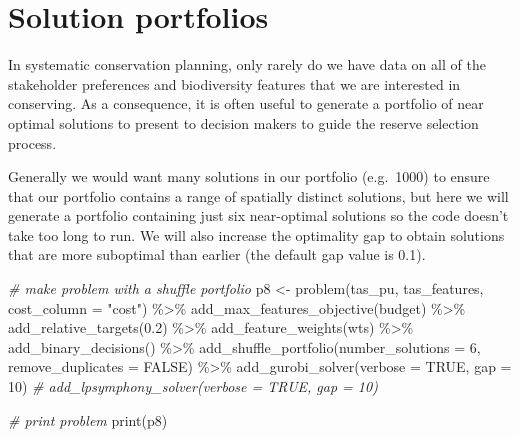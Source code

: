 \documentclass[
  12pt,
]{book}
\newenvironment{Shaded}{\begin{snugshade}}{\end{snugshade}}
\newcommand{\AttributeTok}[1]{\textcolor[rgb]{0.77,0.63,0.00}{#1}}
\newcommand{\CommentTok}[1]{\textcolor[rgb]{0.56,0.35,0.01}{\textit{#1}}}
\newcommand{\ConstantTok}[1]{\textcolor[rgb]{0.00,0.00,0.00}{#1}}
\newcommand{\DecValTok}[1]{\textcolor[rgb]{0.00,0.00,0.81}{#1}}
\newcommand{\FloatTok}[1]{\textcolor[rgb]{0.00,0.00,0.81}{#1}}
\newcommand{\FunctionTok}[1]{\textcolor[rgb]{0.00,0.00,0.00}{#1}}
\newcommand{\NormalTok}[1]{#1}
\newcommand{\OtherTok}[1]{\textcolor[rgb]{0.56,0.35,0.01}{#1}}
\newcommand{\SpecialCharTok}[1]{\textcolor[rgb]{0.00,0.00,0.00}{#1}}
\newcommand{\StringTok}[1]{\textcolor[rgb]{0.31,0.60,0.02}{#1}}
\begin{document}
\hypertarget{solution-portfolios}{%
\section{Solution portfolios}\label{solution-portfolios}}

In systematic conservation planning, only rarely do we have data on all of the stakeholder preferences and biodiversity features that we are interested in conserving. As a consequence, it is often useful to generate a portfolio of near optimal solutions to present to decision makers to guide the reserve selection process.

Generally we would want many solutions in our portfolio (e.g.~1000) to ensure that our portfolio contains a range of spatially distinct solutions, but here we will generate a portfolio containing just six near-optimal solutions so the code doesn't take too long to run. We will also increase the optimality gap to obtain solutions that are more suboptimal than earlier (the default gap value is 0.1).

\begin{Shaded}
\begin{Highlighting}[]
\CommentTok{\# make problem with a shuffle portfolio}
\NormalTok{p8 }\OtherTok{\textless{}{-}} \FunctionTok{problem}\NormalTok{(tas\_pu, tas\_features, }\AttributeTok{cost\_column =} \StringTok{"cost"}\NormalTok{) }\SpecialCharTok{\%\textgreater{}\%}
      \FunctionTok{add\_max\_features\_objective}\NormalTok{(budget) }\SpecialCharTok{\%\textgreater{}\%}
      \FunctionTok{add\_relative\_targets}\NormalTok{(}\FloatTok{0.2}\NormalTok{) }\SpecialCharTok{\%\textgreater{}\%}
      \FunctionTok{add\_feature\_weights}\NormalTok{(wts) }\SpecialCharTok{\%\textgreater{}\%}
      \FunctionTok{add\_binary\_decisions}\NormalTok{() }\SpecialCharTok{\%\textgreater{}\%}
      \FunctionTok{add\_shuffle\_portfolio}\NormalTok{(}\AttributeTok{number\_solutions =} \DecValTok{6}\NormalTok{,}
                            \AttributeTok{remove\_duplicates =} \ConstantTok{FALSE}\NormalTok{) }\SpecialCharTok{\%\textgreater{}\%}
      \FunctionTok{add\_gurobi\_solver}\NormalTok{(}\AttributeTok{verbose =} \ConstantTok{TRUE}\NormalTok{, }\AttributeTok{gap =} \DecValTok{10}\NormalTok{)}
      \CommentTok{\# add\_lpsymphony\_solver(verbose = TRUE, gap = 10)}
\end{Highlighting}
\end{Shaded}

\clearpage

\begin{Shaded}
\begin{Highlighting}[]
\CommentTok{\# print problem}
\FunctionTok{print}\NormalTok{(p8)}
\end{Highlighting}
\end{Shaded}
\end{document}
